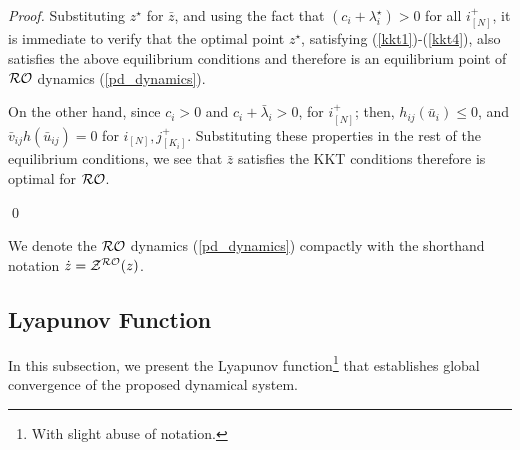 \documentclass[journal,twoside,web]{ieeecolor}
\begin{document}
\begin{proof}
Substituting $z^\star$ for $\bar{z}$, and using the fact that $(c_i+\lambda_i^\star)>0$ for all $i^+_{[N]}$, it is immediate to verify that the optimal point $z^\star$, satisfying (\ref{kkt1})-(\ref{kkt4}), also satisfies the above equilibrium conditions and therefore is an equilibrium point of ${\cal RO}$ dynamics (\ref{pd_dynamics}).

On the other hand, since $c_i> 0$ and $c_i+\bar{\lambda}_i>0$,  for $i_{[N]}^+$; then, $h_{ij}(\bar{u}_i)\leq 0$, and $\bar{v}_{ij} h(\bar{u}_{ij})=0$ for $i_{[N]},j_{[K_i]}^+$. Substituting these properties in the rest of the equilibrium conditions, we see that $\bar{z}$ satisfies the KKT conditions therefore is optimal for ${\cal RO}$.

\qed
\end{proof}


We denote the ${\cal RO}$ dynamics (\ref{pd_dynamics}) compactly with the shorthand notation $\dot z={\cal Z}^{\cal RO}(z)$.

\subsection{Lyapunov Function}
In this subsection, we present the Lyapunov function\footnote{With slight abuse of notation.} that establishes global convergence of the proposed dynamical system.
\end{document}
